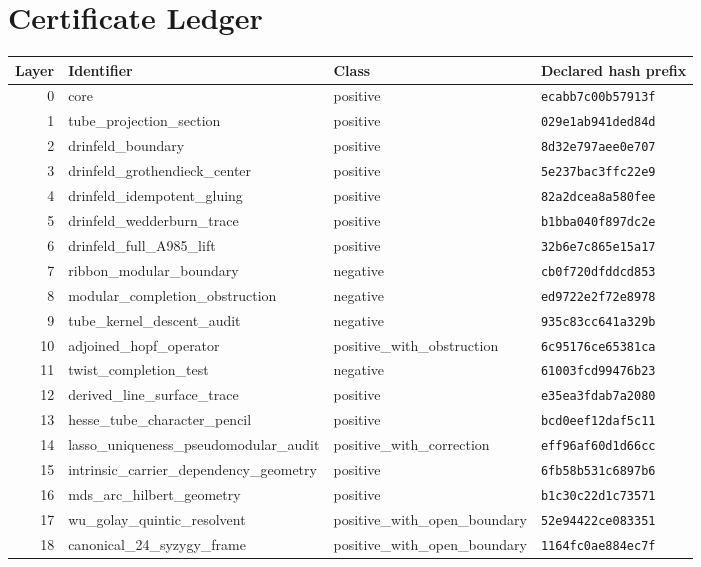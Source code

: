 \section*{Certificate Ledger}
\begin{longtable}{rlll}
\toprule
Layer & Identifier & Class & Declared hash prefix \\
\midrule
0 & core & positive & \texttt{ecabb7c00b57913f} \\
1 & tube\_projection\_section & positive & \texttt{029e1ab941ded84d} \\
2 & drinfeld\_boundary & positive & \texttt{8d32e797aee0e707} \\
3 & drinfeld\_grothendieck\_center & positive & \texttt{5e237bac3ffc22e9} \\
4 & drinfeld\_idempotent\_gluing & positive & \texttt{82a2dcea8a580fee} \\
5 & drinfeld\_wedderburn\_trace & positive & \texttt{b1bba040f897dc2e} \\
6 & drinfeld\_full\_A985\_lift & positive & \texttt{32b6e7c865e15a17} \\
7 & ribbon\_modular\_boundary & negative & \texttt{cb0f720dfddcd853} \\
8 & modular\_completion\_obstruction & negative & \texttt{ed9722e2f72e8978} \\
9 & tube\_kernel\_descent\_audit & negative & \texttt{935c83cc641a329b} \\
10 & adjoined\_hopf\_operator & positive\_with\_obstruction & \texttt{6c95176ce65381ca} \\
11 & twist\_completion\_test & negative & \texttt{61003fcd99476b23} \\
12 & derived\_line\_surface\_trace & positive & \texttt{e35ea3fdab7a2080} \\
13 & hesse\_tube\_character\_pencil & positive & \texttt{bcd0eef12daf5c11} \\
14 & lasso\_uniqueness\_pseudomodular\_audit & positive\_with\_correction & \texttt{eff96af60d1d66cc} \\
15 & intrinsic\_carrier\_dependency\_geometry & positive & \texttt{6fb58b531c6897b6} \\
16 & mds\_arc\_hilbert\_geometry & positive & \texttt{b1c30c22d1c73571} \\
17 & wu\_golay\_quintic\_resolvent & positive\_with\_open\_boundary & \texttt{52e94422ce083351} \\
18 & canonical\_24\_syzygy\_frame & positive\_with\_open\_boundary & \texttt{1164fc0ae884ec7f} \\

\end{longtable}
